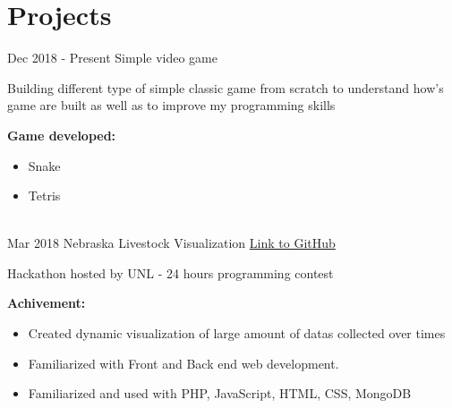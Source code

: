 \documentclass[letterpaper]{twentysecondcv} %
\begin{document}
\section{Projects}
\begin{twenty}
	\twentyitem
    	{Dec 2018 - }
		{Present}
        {Simple video game}
        {} %
        {}
        {
       	Building different type of simple classic game from scratch to understand how's game are built as well as to improve my programming skills
       	
       	\textbf{Game developed:}
        {\begin{itemize}
        \item Snake
        \item Tetris
		\end{itemize}}
        }
    \\
    \twentyitem
    	{Mar 2018}
		{}
        {Nebraska Livestock Visualization}
        {\href{https://github.com/HuyNVuong/Nebraska-livestock-Visualisation}{Link to GitHub}} %
        {}
        {
       	Hackathon hosted by UNL - 24 hours programming contest
       	
       	\textbf{Achivement:}
        {\begin{itemize}
        \item Created dynamic visualization of large amount of datas collected over times
        \item Familiarized with Front and Back end web development.
        \item Familiarized and used with PHP, JavaScript, HTML, CSS, MongoDB
		\end{itemize}}
        }
\end{twenty}
\end{document}
